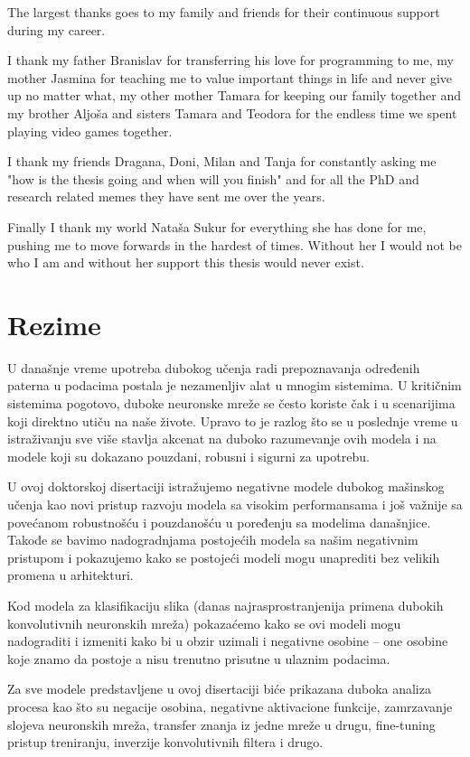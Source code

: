 \documentclass[b5paper]{book}
\begin{document}
The largest thanks goes to my family and friends for their continuous support during my career. 

I thank my father Branislav for transferring his love for programming to me, my mother Jasmina for teaching me to value important things in life and never give up no matter what, my other mother Tamara for keeping our family together and my brother Aljoša and sisters Tamara and Teodora for the endless time we spent playing video games together.

I thank my friends Dragana, Doni, Milan and Tanja for constantly asking me "how is the thesis going and when will you finish" and for all the PhD and research related memes they have sent me over the years. 

Finally I thank my world Nataša Sukur for everything she has done for me, pushing me to move forwards in the hardest of times. Without her I would not be who I am and without her support this thesis would never exist.

\chapter{Rezime}

U današnje vreme upotreba dubokog učenja radi prepoznavanja određenih paterna u podacima postala je nezamenljiv alat u mnogim sistemima. U kritičnim sistemima pogotovo, duboke neuronske mreže se često koriste čak i u scenarijima koji direktno utiču na naše živote. Upravo to je razlog što se u poslednje vreme u istraživanju sve više stavlja akcenat na duboko razumevanje ovih modela i na modele koji su dokazano pouzdani, robusni i sigurni za upotrebu.

U ovoj doktorskoj disertaciji istražujemo negativne modele dubokog mašinskog učenja kao novi pristup razvoju modela sa visokim performansama i još važnije sa povećanom robustnošću i pouzdanošću u poređenju sa modelima današnjice. Takođe se bavimo nadogradnjama postojećih modela sa našim negativnim pristupom i pokazujemo kako se postojeći modeli mogu unaprediti bez velikih promena u arhitekturi.

Kod modela za klasifikaciju slika (danas najrasprostranjenija primena dubokih konvolutivnih neuronskih mreža) pokazaćemo kako se ovi modeli mogu nadograditi i izmeniti kako bi u obzir uzimali i negativne osobine -- one osobine koje znamo da postoje a nisu trenutno prisutne u ulaznim podacima.

Za sve modele predstavljene u ovoj disertaciji biće prikazana duboka analiza procesa kao što su negacije osobina, negativne aktivacione funkcije, zamrzavanje slojeva neuronskih mreža, transfer znanja iz jedne mreže u drugu, fine-tuning pristup treniranju, inverzije konvolutivnih filtera i drugo.
\end{document}
